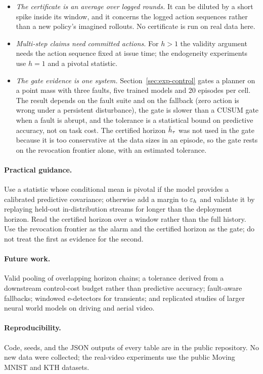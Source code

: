 \begin{itemize}[leftmargin=1.4em,itemsep=2pt]
\item \emph{The certificate is an average over logged rounds.} It can be diluted by a short spike inside its window, and it concerns the logged action sequences rather than a new policy's imagined rollouts. No certificate is run on real data here.
\item \emph{Multi-step claims need committed actions.} For $h>1$ the validity argument needs the action sequence fixed at issue time; the endogeneity experiments use $h=1$ and a pivotal statistic.
\item \emph{The gate evidence is one system.} Section~\ref{sec:exp-control} gates a planner on a point mass with three faults, five trained models and 20 episodes per cell. The result depends on the fault suite and on the fallback (zero action is wrong under a persistent disturbance), the gate is slower than a CUSUM gate when a fault is abrupt, and the tolerance is a statistical bound on predictive accuracy, not on task cost. The certified horizon $\hat h_\tau$ was not used in the gate because it is too conservative at the data sizes in an episode, so the gate rests on the revocation frontier alone, with an estimated tolerance.
\end{itemize}

\paragraph{Practical guidance.} Use a statistic whose conditional mean is pivotal if the model provides a calibrated predictive covariance; otherwise add a margin to $\varepsilon_h$ and validate it by replaying held-out in-distribution streams for longer than the deployment horizon. Read the certified horizon over a window rather than the full history. Use the revocation frontier as the alarm
and the certified horizon as the gate; do not treat the first as evidence for the second.

\paragraph{Future work.} Valid pooling of overlapping horizon chains; a tolerance derived from a downstream control-cost budget rather than predictive accuracy; fault-aware fallbacks; windowed e-detectors for transients; and replicated studies of larger neural world models on driving and aerial video.

\paragraph{Reproducibility.} Code, seeds, and the JSON outputs of every table are in the public repository. No new data were collected; the real-video experiments use the public Moving MNIST and KTH datasets.
